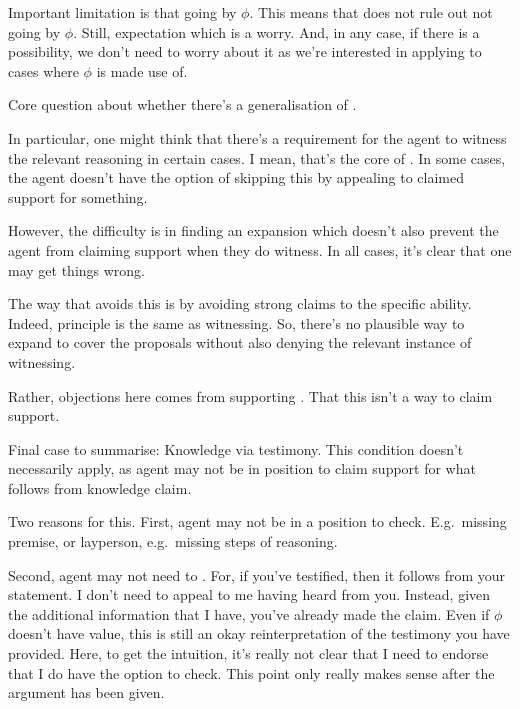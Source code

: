 \begin{note}
  Important limitation is that going by \(\phi\).
  This means that \nI{} does not rule out not going by \(\phi\).
  Still, expectation which is a worry.
  And, in any case, if there is a possibility, we don't need to worry about it as we're interested in applying \nI{} to cases where \(\phi\) is made use of.
\end{note}

\begin{note}[Generalising \nI{}]
  Core question about whether there's a generalisation of \nI{}.

  In particular, one might think that there's a requirement for the agent to witness the relevant reasoning in certain cases.
  I mean, that's the core of \nI{}.
  In some cases, the agent doesn't have the option of skipping this by appealing to claimed support for something.

  However, the difficulty is in finding an expansion which doesn't also prevent the agent from claiming support when they do witness.
  In all cases, it's clear that one may get things wrong.

  The way that \adB{} avoids this is by avoiding strong claims to the specific ability.
  Indeed, principle is the same as witnessing.
  So, there's no plausible way to expand \nI{} to cover the proposals without also denying the relevant instance of witnessing.

  Rather, objections here comes from supporting \ESU{}.
  That this isn't a way to claim support.
\end{note}

\begin{note}
  Final case to summarise:
  Knowledge via testimony.
  This condition doesn't necessarily apply, as agent may not be in position to claim support for what follows from knowledge claim.

  Two reasons for this.
  First, agent may not be in a position to check.
  E.g.\ missing premise, or layperson, e.g.\ missing steps of reasoning.

  Second, agent may not need to \RBV{-}.
  For, if you've testified, then it follows from your statement.
  I don't need to appeal to me having heard from you.
  Instead, given the additional information that I have, you've already made the claim.
  Even if \(\phi\) doesn't have value, this is still an okay reinterpretation of the testimony you have provided.
  Here, to get the intuition, it's really not clear that I need to endorse that I do have the option to check.
  {
    \color{red}
    This point only really makes sense after the argument has been given.
  }
\end{note}

